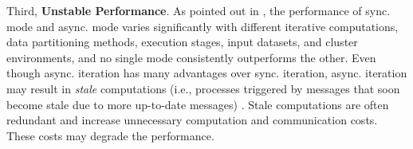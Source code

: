 Third, \textbf{Unstable Performance}. As pointed out in \cite{Xie2015SYNC}, the performance of sync. mode and async. mode varies significantly with different iterative computations, data partitioning methods, execution stages, input datasets, and cluster environments, and no single mode consistently outperforms the other. Even though async. iteration has many advantages over sync. iteration, async. iteration may result in \emph{stale} computations (i.e., processes triggered by messages that soon become stale due to more up-to-date messages) \cite{Fan2018Adaptive}. Stale computations are often redundant and increase unnecessary computation and communication costs. These costs may degrade the performance.




